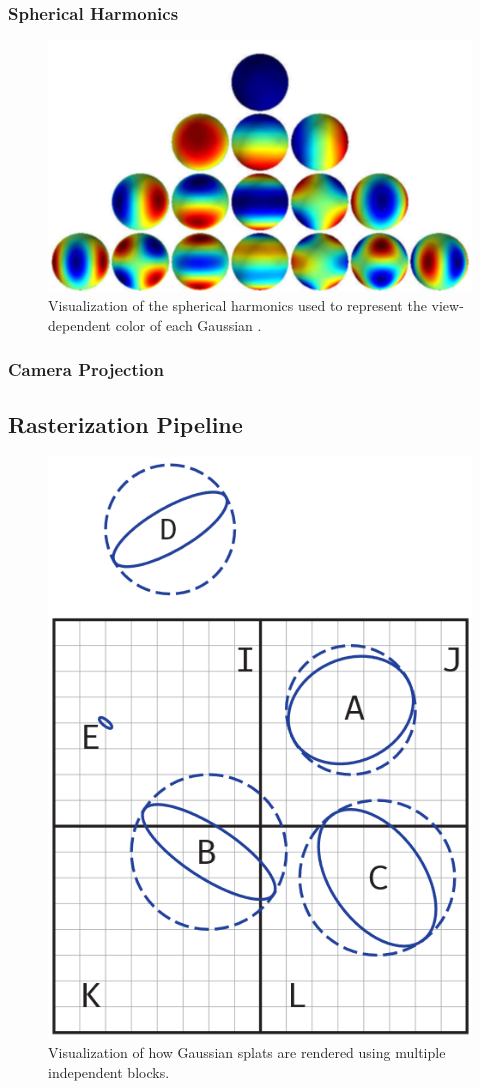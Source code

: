 \subsubsection{Spherical Harmonics}
\begin{figure}
    \centering
    \includegraphics[width=\linewidth]{images/spherical_harmonics.png}
    \caption{Visualization of the spherical harmonics used to represent the view-dependent color of each Gaussian \cite[Fig. 3]{kerbl3DGaussianSplatting2023}.}
\end{figure}

\subsubsection{Camera Projection}

\subsection{Rasterization Pipeline}
\begin{figure}
    \centering
    \includegraphics[width=0.6\linewidth]{images/rendering.png}
    \caption{Visualization of how Gaussian splats are rendered using multiple independent blocks.}
\end{figure}
\label{sec:rasterization}

